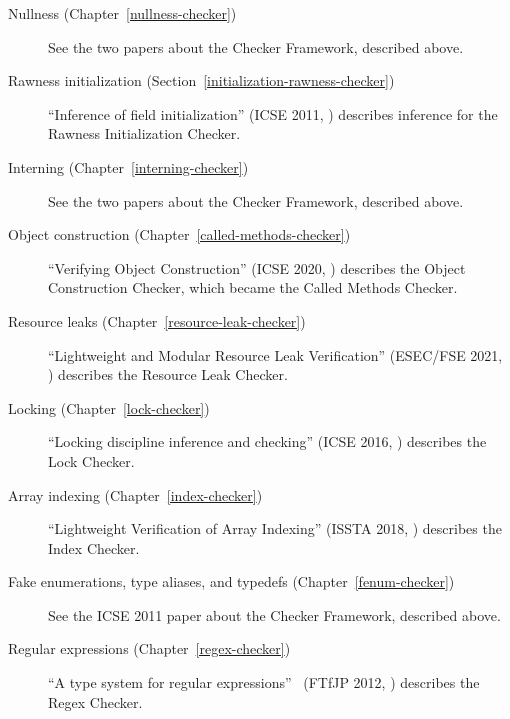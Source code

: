 \begin{description}
\item[Nullness (Chapter~\ref{nullness-checker})]
See the two papers about the Checker Framework, described above.

\item[Rawness initialization (Section~\ref{initialization-rawness-checker})]
``Inference of field initialization'' (ICSE 2011, )
describes inference for the Rawness Initialization Checker.

\item[Interning (Chapter~\ref{interning-checker})]
See the two papers about the Checker Framework, described above.

\item[Object construction (Chapter~\ref{called-methods-checker})]
``Verifying Object Construction'' (ICSE 2020,
)
describes the Object Construction Checker, which became the Called Methods Checker.

\item[Resource leaks (Chapter~\ref{resource-leak-checker})]
``Lightweight and Modular Resource Leak Verification'' (ESEC/FSE 2021,
)
describes the Resource Leak Checker.

\item[Locking (Chapter~\ref{lock-checker})]
``Locking discipline inference and checking'' (ICSE 2016,
)
describes the Lock Checker.

\item[Array indexing (Chapter~\ref{index-checker})]
``Lightweight Verification of Array Indexing'' (ISSTA 2018,
)
describes the Index Checker.

\item[Fake enumerations, type aliases, and typedefs (Chapter~\ref{fenum-checker})]
See the ICSE 2011 paper about the Checker Framework, described above.

\item[Regular expressions (Chapter~\ref{regex-checker})]
``A type system for regular expressions''~\cite{SpishakDE2012} (FTfJP 2012, )
            describes the Regex Checker.


\end{description}
